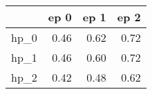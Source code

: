 \begin{tabular}{lrrr}
\toprule
{} &  ep 0 &  ep 1 &  ep 2 \\
\midrule
hp\_0 &  0.46 &  0.62 &  0.72 \\
hp\_1 &  0.46 &  0.60 &  0.72 \\
hp\_2 &  0.42 &  0.48 &  0.62 \\
\bottomrule
\end{tabular}
